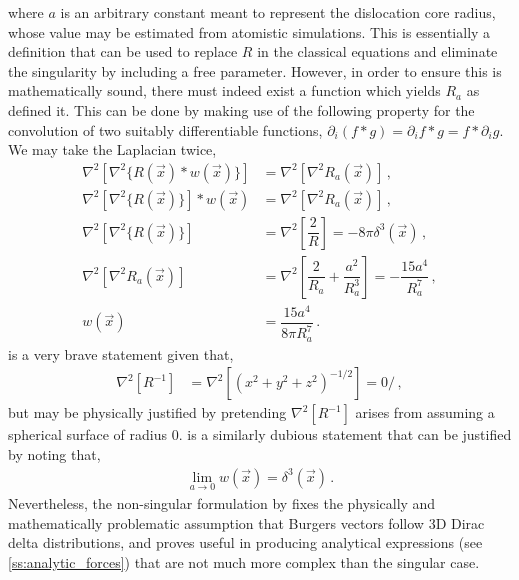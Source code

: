 where $ a $ is an arbitrary constant meant to represent the dislocation core radius, whose value may be estimated from atomistic simulations. This is essentially a definition that can be used to replace $ R $ in the classical equations and eliminate the singularity by including a free parameter. However, in order to ensure this is mathematically sound, there must indeed exist a function which yields $ R_{a} $ as \citet{a_non-singular_continuum_theory_of_dislocations} defined it. This can be done by making use of the following property for the convolution of two suitably differentiable functions, $ \partial_{i} (f*g) = \partial_{i}f * g = f * \partial_{i} g $. We may take the Laplacian twice,
\begin{subequations}
    \begin{align}
        \nabla^{2}[\nabla^{2} \{R(\vec{x}) * w(\vec{x})\} ] & = \nabla^{2}[\nabla^{2} R_{a}(\vec{x})]\,,                                                             \\
        \nabla^{2}[\nabla^{2} \{R(\vec{x})\}] * w(\vec{x})  & = \nabla^{2}[\nabla^{2} R_{a}(\vec{x})]\,,                                                             \\
        \nabla^{2}[\nabla^{2} \{R(\vec{x})\}]               & = \nabla^{2}\left[\dfrac{2}{R}\right] = -8\pi \delta^{3}(\vec{x}) \label{eq:hand_wavy}\,,              \\
        \nabla^{2}[\nabla^{2} R_{a}(\vec{x})]               & = \nabla^{2}\left[\dfrac{2}{R_{a}} + \dfrac{a^{2}}{R_{a}^{3}}\right] = -\dfrac{15 a^{4}}{R_{a}^{7}}\,, \\
        w(\vec{x})                                          & = \dfrac{15 a^{4}}{8\pi R_{a}^{7}} \label{eq:dist}\,.
    \end{align}
\end{subequations}
 is a very brave statement given that,
\begin{align}
    \nabla^{2} \left[R^{-1}\right] & = \nabla^{2}\left[(x^{2} + y^{2} + z^{2})^{-1/2}\right] = 0/\,,
\end{align}
but may be physically justified by pretending $ \nabla^{2}\left[R^{-1}\right] $ arises from assuming a spherical surface of radius 0.  is a similarly dubious statement that can be justified by noting that,
\begin{align}
    \lim\limits_{a\to 0} w(\vec{x}) = \delta^{3}(\vec{x})\,.
\end{align}
Nevertheless, the non-singular formulation by \citet{a_non-singular_continuum_theory_of_dislocations} fixes the physically and mathematically problematic assumption that Burgers vectors follow 3D Dirac delta distributions, and proves useful in producing analytical expressions (see \cref{ss:analytic_forces}) that are not much more complex than the singular case.

